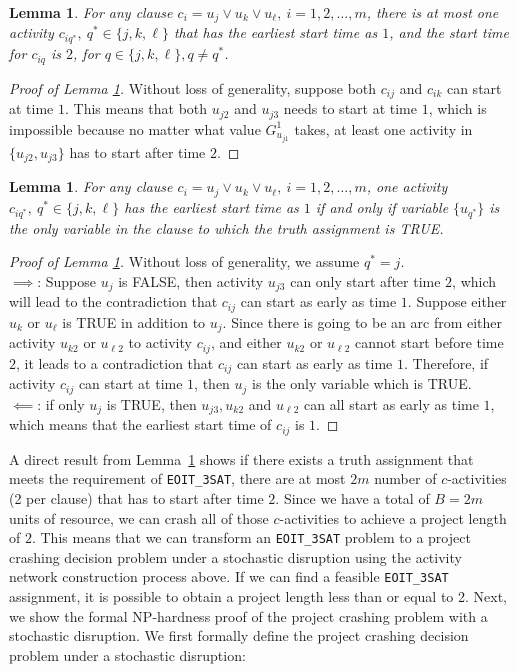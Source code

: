 \documentclass[11pt]{article}
\newtheorem{lemma}[theorem]{Lemma}
\newcommand{\noi}{\noindent}
\begin{document}
	\begin{lemma} \label{lemma:onlyOne}
		For any clause \(c_i = u_j \vee u_k \vee u_\ell,\ i = 1,2,\dots,m\), there is at most one activity \(c_{iq^*},\ q^* \in \{j,k,\ell\}\) that has the earliest start time as \(1\), and the start time for \(c_{iq}\) is \(2\), for \(q \in \{j,k,\ell\}, q \neq q^*\).
	\end{lemma}
	\begin{proof}[Proof of Lemma \ref{lemma:onlyOne}]
		Without loss of generality, suppose both \(c_{ij}\) and \(c_{ik}\) can start at time \(1\). This means that both \(u_{j2}\) and \(u_{j3}\) needs to start at time \(1\), which is impossible because no matter what value \(G^1_{u_{j1}}\) takes, at least one activity in \(\{u_{j2},u_{j3}\}\) has to start after time \(2\).
	\end{proof}
	\begin{lemma} \label{lemma:iff}
		For any clause \(c_i = u_j \vee u_k \vee u_\ell,\ i = 1,2,\dots,m\), one activity \(c_{iq^*},\ q^* \in \{j,k,\ell\}\) has the earliest start time as \(1\) if and only if variable \(\{u_{q^*}\}\) is the only variable in the clause to which the truth assignment is TRUE.
	\end{lemma}
	\begin{proof}[Proof of Lemma \ref{lemma:iff}]
		Without loss of generality, we assume \(q^* = j\).\\
		\(\implies\):  Suppose \(u_j\) is FALSE, then activity \(u_{j3}\) can only start after time \(2\), which will lead to the contradiction that \(c_{ij}\) can start as early as time \(1\). Suppose either \(u_k\) or \(u_\ell\) is TRUE in addition to \(u_j\). Since there is going to be an arc from either activity \(u_{k2}\) or \(u_{\ell 2}\) to activity \(c_{ij}\), and either \(u_{k2}\) or \(u_{\ell 2}\) cannot start before time \(2\), it leads to a contradiction that \(c_{ij}\) can start as early as time \(1\). Therefore, if activity \(c_{ij}\) can start at time \(1\), then \(u_j\) is the only variable which is TRUE.\\
		\(\impliedby\): if only \(u_j\) is TRUE, then \(u_{j3}, u_{k2}\) and \(u_{\ell 2}\) can all start as early as time \(1\), which means that the earliest start time of \(c_{ij}\) is \(1\).
	\end{proof}
	\noi A direct result from Lemma~\ref{lemma:iff} shows if there exists a truth assignment that meets the requirement of \verb|EOIT_3SAT|, there are at most \(2m\) number of \(c\)-activities (2 per clause) that has to start after time \(2\). Since we have a total of \(B = 2m\) units of resource, we can crash all of those \(c\)-activities to achieve a project length of \(2\). This means that we can transform an \verb|EOIT_3SAT| problem to a project crashing decision problem under a stochastic disruption using the activity network construction process above. If we can find a feasible \verb|EOIT_3SAT| assignment, it is possible to obtain a project length less than or equal to 2. Next, we show the formal NP-hardness proof of the project crashing problem with a stochastic disruption. We first formally define the project crashing decision problem under a stochastic disruption:
\end{document}
